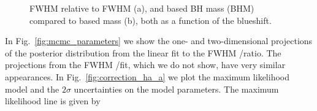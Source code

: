 \begin{figure}
    \captionsetup[subfigure]{labelformat=empty} 
    \centering
    \subfloat[\label{fig:correction_hb_a}]{}
    \subfloat[\label{fig:correction_hb_b}]{}
    \caption{ FWHM relative to \hb FWHM (a), and  based BH mass (BHM) compared to \hb based mass (b), both as a function of the  blueshift.}  
    \label{fig:correction_hb}
\end{figure}

In Fig.~\ref{fig:mcmc_parameters} we show the one- and two-dimensional projections of the posterior distribution from the linear fit to the FWHM /\ha ratio. 
The projections from the FWHM /\hb fit, which we do not show, have very similar appearances.
In Fig.~\ref{fig:correction_ha_a} we plot the maximum likelihood model and the $2\sigma$ uncertainties on the model parameters. 
The maximum likelihood line is given by  


